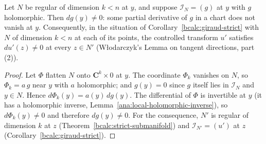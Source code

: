 \begin{lemma}
\label{bcalc:multiplicity-one}
\mixedleanok
Let \(N\) be regular of dimension \(k<n\) at \(y\), and suppose \(\mathcal I_N=(g)\) at \(y\) with \(g\) holomorphic. Then \(dg(y)\ne0\): some partial
derivative of \(g\) in a chart does not vanish at \(y\). Consequently, in the situation of Corollary~\ref{bcalc:giraud-strict} with \(N\) of
dimension \(k<n\) at each of its points, the controlled transform \(u'\) satisfies \(du'(z)\ne0\) at every \(z\in N'\) (Włodarczyk's Lemma on
tangent directions, part (2)).
\end{lemma}
\begin{proof}
\mixedleanok
Let \(\Phi\) flatten \(N\) onto \(\mathbf C^{k}\times0\) at \(y\). The coordinate \(\Phi_k\) vanishes on \(N\), so \(\Phi_k=a\,g\) near \(y\) with \(a\) holomorphic;
and \(g(y)=0\) since \(g\) itself lies in \(\mathcal I_N\) and \(y\in N\). Hence \(d\Phi_k(y)=a(y)\,dg(y)\). The differential of \(\Phi\) is invertible at
\(y\) (it has a holomorphic inverse, Lemma~\ref{ana:local-holomorphic-inverse}), so \(d\Phi_k(y)\ne0\) and therefore \(dg(y)\ne0\). For the
consequence, \(N'\) is regular of dimension \(k\) at \(z\) (Theorem~\ref{bcalc:strict-submanifold}) and \(\mathcal I_{N'}=(u')\) at \(z\)
(Corollary~\ref{bcalc:giraud-strict}).
\end{proof}

